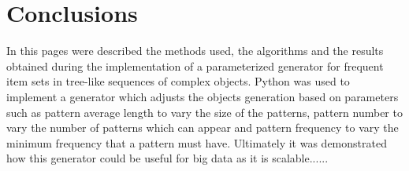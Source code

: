 \documentclass{acm_proc_article-sp-sigmod09}
\begin{document}
\section{Conclusions}
In this pages were described the methods used, the algorithms and the results obtained during the implementation of a parameterized generator for frequent item sets in tree-like sequences of complex objects. Python was used to implement a generator which adjusts the objects generation based on parameters such as pattern average length to vary the size of the patterns, pattern number to vary the number of patterns which can appear and pattern frequency to vary the minimum frequency that a pattern must have. Ultimately it was demonstrated how this generator could be useful for big data as it is scalable......
%

%
%
\end{document}
